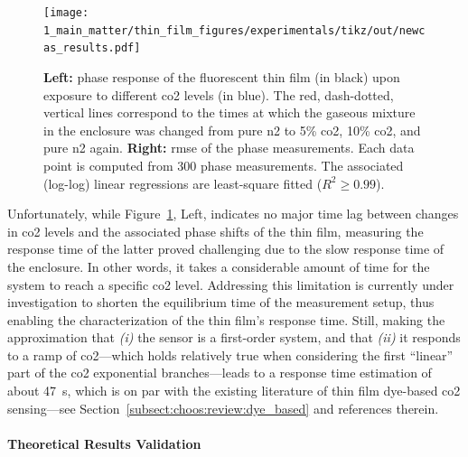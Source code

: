 \begin{figure}
	\centering
	\texttt{[image: 1\_main\_matter/thin\_film\_figures/experimentals/tikz/out/newcas\_results.pdf]}
	\caption[Phase response of the fluorescent thin film upon exposure to different \gls{co2} levels, and evolution of the phase \gls{rmse}.]{\textbf{Left:} phase response of the fluorescent thin film (in black) upon exposure to different \gls{co2} levels (in blue). The red, dash-dotted, vertical lines correspond to the times at which the gaseous mixture in the enclosure was changed from pure \gls{n2} to 5\% \gls{co2}, 10\% \gls{co2}, and pure \gls{n2} again. \textbf{Right:} \gls{rmse} of the phase measurements. Each data point is computed from 300 phase measurements. The associated (log-log) linear regressions are least-square fitted ($R^2 \geq 0.99$).}
	\label{fig:thin_film:experimental:newcas_results}
\end{figure}

Unfortunately, while Figure~\ref{fig:thin_film:experimental:newcas_results}, Left, indicates no major time lag between changes in \gls{co2} levels and the associated phase shifts of the thin film, measuring the response time of the latter proved challenging due to the slow response time of the enclosure. In other words, it takes a considerable amount of time for the system to reach a specific \gls{co2} level. Addressing this limitation is currently under investigation to shorten the equilibrium time of the measurement setup, thus enabling the characterization of the thin film's response time. Still, making the approximation that \textit{(i)} the sensor is a first-order system, and that \textit{(ii)} it responds to a ramp of \gls{co2}---which holds relatively true when considering the first \enquote{linear} part of the \gls{co2} exponential branches---leads to a response time estimation of about 47~s, which is on par with the existing literature of thin film dye-based \gls{co2} sensing---see Section~\ref{subsect:choos:review:dye_based} and references therein.

\paragraph{Theoretical Results Validation}\mbox{}\\

